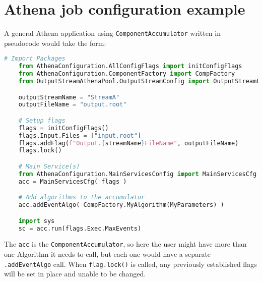 \section{Athena job configuration example}
A general Athena application using \verb|ComponentAccumulator| written in pseudocode would take the form: 
\begin{lstlisting}[language=Python]
    # Import Packages
    from AthenaConfiguration.AllConfigFlags import initConfigFlags
    from AthenaConfiguration.ComponentFactory import CompFactory
    from OutputStreamAthenaPool.OutputStreamConfig import OutputStreamCfg, outputStreamName

    outputStreamName = "StreamA"
    outputFileName = "output.root"

    # Setup flags
    flags = initConfigFlags()
    flags.Input.Files = ["input.root"]
    flags.addFlag(f"Output.{streamName}FileName", outputFileName)
    flags.lock()

    # Main Service(s)
    from AthenaConfiguration.MainServicesConfig import MainServicesCfg
    acc = MainServicesCfg( flags )

    # Add algorithms to the accumulator
    acc.addEventAlgo( CompFactory.MyAlgorithm(MyParameters) )

    import sys
    sc = acc.run(flags.Exec.MaxEvents)
\end{lstlisting}

The \verb|acc| is the \verb|ComponentAccumulator|, so here the user might have more than one Algorithm it needs to call, but each one would have a separate \verb|.addEventAlgo| call. 
When \verb|flag.lock()| is called, any previously established flags will be set in place and unable to be changed. 